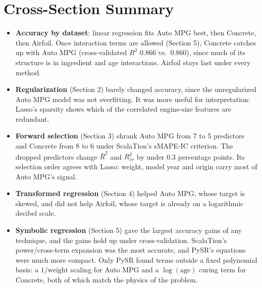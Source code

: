 \documentclass[11pt]{article}
\begin{document}
\section*{Cross-Section Summary}
\begin{itemize}
    \item \textbf{Accuracy by dataset}: linear regression fits Auto MPG best,
    then Concrete, then Airfoil. Once interaction terms are allowed
    (Section 5), Concrete catches up with Auto MPG (cross-validated $R^2$
    0.866 vs.\ 0.860), since much of its structure is in ingredient and age
    interactions. Airfoil stays last under every method.
    \item \textbf{Regularization} (Section 2) barely changed accuracy, since
    the unregularized Auto MPG model was not overfitting. It was more useful
    for interpretation: Lasso's sparsity shows which of the correlated
    engine-size features are redundant.
    \item \textbf{Forward selection} (Section 3) shrank Auto MPG from 7 to 5
    predictors and Concrete from 8 to 6 under ScalaTion's sMAPE-IC
    criterion. The dropped predictors change $\bar R^2$ and $R^2_{cv}$ by
    under 0.3 percentage points. Its selection order agrees with Lasso:
    weight, model year and origin carry most of Auto MPG's signal.
    \item \textbf{Transformed regression} (Section 4) helped Auto MPG, whose
    target is skewed, and did not help Airfoil, whose target is already on a
    logarithmic decibel scale.
    \item \textbf{Symbolic regression} (Section 5) gave the largest accuracy
    gains of any technique, and the gains hold up under cross-validation.
    ScalaTion's power/cross-term expansion was the most accurate, and PySR's
    equations were much more compact. Only PySR found terms outside a fixed
    polynomial basis: a $1/\text{weight}$ scaling for Auto MPG and a
    $\log(\text{age})$ curing term for Concrete, both of which match the
    physics of the problem.
\end{itemize}
\end{document}
